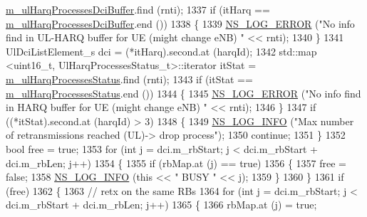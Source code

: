 \begin{DoxyCode}
      \hyperlink{classns3_1_1RrFfMacScheduler_a530849c4c8d3d5b0796e6af3d8d95173}{m\_ulHarqProcessesDciBuffer}.find (rnti);
1337               \textcolor{keywordflow}{if} (itHarq == \hyperlink{classns3_1_1RrFfMacScheduler_a530849c4c8d3d5b0796e6af3d8d95173}{m\_ulHarqProcessesDciBuffer}.end ())
1338                 \{
1339                   \hyperlink{group__logging_ga0261a8db1d4ac5f79417d117634fd455}{NS\_LOG\_ERROR} (\textcolor{stringliteral}{"No info find in UL-HARQ buffer for UE (might change eNB) "} << 
      rnti);
1340                 \}
1341               UlDciListElement\_s dci = (*itHarq).second.at (harqId);
1342               std::map <uint16\_t, UlHarqProcessesStatus\_t>::iterator itStat = 
      \hyperlink{classns3_1_1RrFfMacScheduler_a13fbe24878639869771e77ff813373ff}{m\_ulHarqProcessesStatus}.find (rnti);
1343               \textcolor{keywordflow}{if} (itStat == \hyperlink{classns3_1_1RrFfMacScheduler_a13fbe24878639869771e77ff813373ff}{m\_ulHarqProcessesStatus}.end ())
1344                 \{
1345                   \hyperlink{group__logging_ga0261a8db1d4ac5f79417d117634fd455}{NS\_LOG\_ERROR} (\textcolor{stringliteral}{"No info find in HARQ buffer for UE (might change eNB) "} << 
      rnti);
1346                 \}
1347               \textcolor{keywordflow}{if} ((*itStat).second.at (harqId) > 3)
1348                 \{
1349                   \hyperlink{group__logging_gafbd73ee2cf9f26b319f49086d8e860fb}{NS\_LOG\_INFO} (\textcolor{stringliteral}{"Max number of retransmissions reached (UL)-> drop process"});
1350                   \textcolor{keywordflow}{continue};
1351                 \}
1352               \textcolor{keywordtype}{bool} free = \textcolor{keyword}{true};
1353               \textcolor{keywordflow}{for} (\textcolor{keywordtype}{int} j = dci.m\_rbStart; j < dci.m\_rbStart + dci.m\_rbLen; j++)
1354                 \{
1355                   \textcolor{keywordflow}{if} (rbMap.at (j) == \textcolor{keyword}{true})
1356                     \{
1357                       free = \textcolor{keyword}{false};
1358                       \hyperlink{group__logging_gafbd73ee2cf9f26b319f49086d8e860fb}{NS\_LOG\_INFO} (\textcolor{keyword}{this} << \textcolor{stringliteral}{" BUSY "} << j);
1359                     \}
1360                 \}
1361               \textcolor{keywordflow}{if} (free)
1362                 \{
1363                   \textcolor{comment}{// retx on the same RBs}
1364                   \textcolor{keywordflow}{for} (\textcolor{keywordtype}{int} j = dci.m\_rbStart; j < dci.m\_rbStart + dci.m\_rbLen; j++)
1365                     \{
1366                       rbMap.at (j) = \textcolor{keyword}{true};

\end{DoxyCode}
